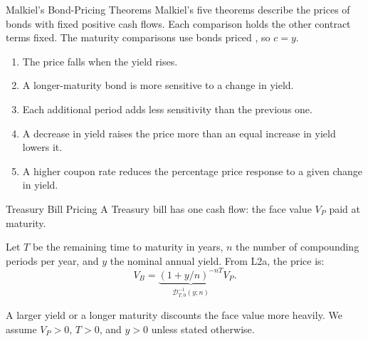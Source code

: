 \documentclass[aspectratio=169,11pt]{beamer}
\begin{document}
\begin{frame}{Malkiel's Bond-Pricing Theorems}
  \vspace{0.2em}
  Malkiel's five theorems describe the prices of  bonds with
  fixed positive cash flows. Each comparison holds the other contract terms
  fixed. The maturity comparisons use bonds priced , so $c=y$.

  \vspace{0.4em}
  \begin{enumerate}\setlength{\itemsep}{0.35em}
    \item The price falls when the yield rises.
    \item A longer-maturity bond is more sensitive to a change in yield.
    \item Each additional period adds less sensitivity than the previous one.
    \item A decrease in yield raises the price more than an equal increase in
      yield lowers it.
    \item A higher coupon rate reduces the percentage price response to a given
      change in yield.
  \end{enumerate}

\end{frame}

\begin{frame}{Treasury Bill Pricing}
  \vspace{0.3em}
  A Treasury bill has one cash flow: the face value $V_P$ paid at maturity.

  \vspace{0.5em}
  Let $T$ be the remaining time to maturity in years, $n$ the number of
  compounding periods per year, and $y$ the nominal annual yield. From L2a, the
  price is:
  \[
    V_B=\underbrace{\left(1+y/n\right)^{-nT}}_{\mathcal D_{T,0}^{-1}(y;n)}V_P .
  \]

  \vspace{0.4em}
  A larger yield or a longer maturity discounts the face value more heavily. We
  assume $V_P>0$, $T>0$, and $y>0$ unless stated otherwise.
\end{frame}
\end{document}
